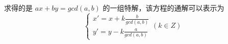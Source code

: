 求得的是 $ax+by=gcd(a,b)$ 的一组特解，该方程的通解可以表示为
$$\begin{cases}x'=x+k\frac{b}{gcd(a,b)}\\y'=y-k\frac{a}{gcd(a,b)}\end{cases}(k\in Z)$$